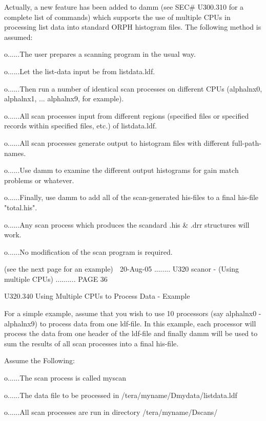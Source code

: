    Actually, a new feature has been added to damm (see  SEC#  U300.310  for  a
   complete  list  of  commands)  which  supports  the use of multiple CPUs in
   processing list data into standard  ORPH  histogram  files.  The  following
   method is assumed:
 
   o......The user prepares a scanning program in the usual way.
 
   o......Let the list-data input be from listdata.ldf.
 
   o......Then  run  a  number  of  identical scan processes on different CPUs
          (alphalnx0, alphalnx1, ... alphalnx9, for example).
 
   o......All scan processes input from different regions (specified files  or
          specified records within specified files, etc.) of listdata.ldf.
 
   o......All scan processes generate output to histogram files with different
          full-path-names.
 
   o......Use  damm  to examine the different output histograms for gain match
          problems or whatever.
 
   o......Finally, use damm to add all of the scan-generated  his-files  to  a
          final his-file "total.his".
 
   o......Any  scan process which produces the scandard .his & .drr structures
          will work.
 
   o......No modification of the scan program is required.
 
                       (see the next page for an example)
    
   20-Aug-05 ........ U320  scanor - (Using multiple CPUs) .......... PAGE  36
 
 
   U320.340  Using Multiple CPUs to Process Data - Example
 
   For a simple example, assume that  you  wish  to  use  10  processors  (say
   alphalnx0  - alphalnx9) to process data from one ldf-file. In this example,
   each processor will process the data from one header of  the  ldf-file  and
   finally  damm  will be used to sum the results of all scan processes into a
   final his-file.
 
   Assume the Following:
 
   o......The scan process is called myscan
 
   o......The data file to be processed in /tera/myname/Dmydata/listdata.ldf
 
   o......All scan processes are run in directory /tera/myname/Dscans/
 
